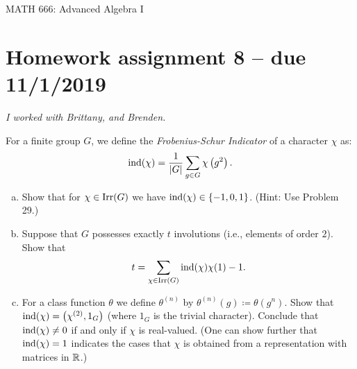 \documentclass[leqno]{article}
\author{Colin Roberts}
\begin{document}
\begin{center}
  \begin{huge}
    MATH 666: Advanced Algebra I
  \end{huge}
\end{center}

\section*{Homework assignment 8 -- due 11/1/2019}
\noindent \emph{I worked with Brittany, and Brenden.}
\setcounter{problem}{33}

\begin{problem}
For a finite group $G$, we define the \emph{Frobenius-Schur Indicator} of a character $\chi$ as:
\[
\mathrm{ind}(\chi)=\frac{1}{|G|}\sum_{g\in G} \chi\left(g^2\right).
\]
\begin{enumerate}[(a)]
    \item Show that for $\chi\in \mathrm{Irr}(G)$ we have $\mathrm{ind}(\chi)\in \{-1,0,1\}$. (Hint: Use Problem 29.)
    \item Suppose that $G$ possesses exactly $t$ involutions (i.e., elements of order $2$). Show that
    \[
    t=\sum_{\chi \in \mathrm{Irr}(G)} \mathrm{ind}(\chi)\chi(1)-1.
    \]
    \item For a class function $\theta$ we define $\theta^{(n)}$ by $\theta^{(n)}(g)\coloneqq \theta(g^n)$. Show that $\mathrm{ind}(\chi)=\left(\chi^{(2)},1_G\right)$ (where $1_G$ is the trivial character). Conclude that $\mathrm{ind}(\chi)\neq 0$ if and only if $\chi$ is real-valued. (One can show further that $\mathrm{ind}(\chi)=1$ indicates the cases that $\chi$ is obtained from a representation with matrices in $\mathbb{R}$.)
\end{enumerate}
\end{problem}
\end{document}

